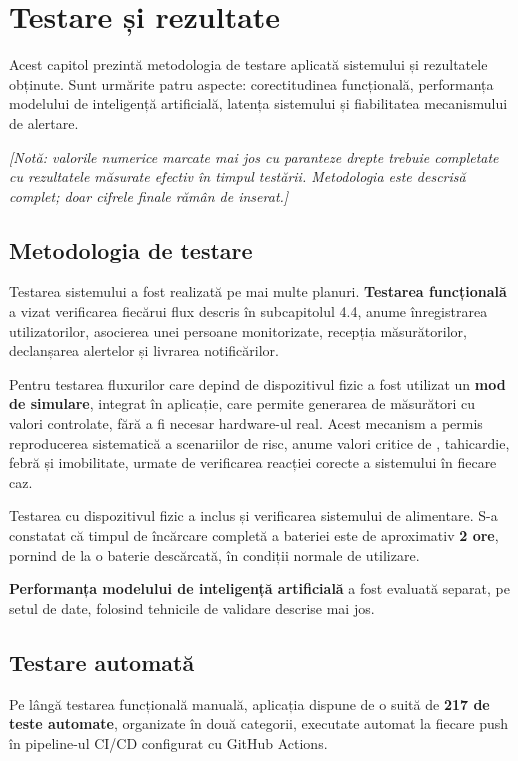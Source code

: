 \newpage
\section{Testare și rezultate}

Acest capitol prezintă metodologia de testare aplicată sistemului și rezultatele obținute. Sunt urmărite patru aspecte: corectitudinea funcțională, performanța modelului de inteligență artificială, latența sistemului și fiabilitatea mecanismului de alertare.

\textit{[Notă: valorile numerice marcate mai jos cu paranteze drepte trebuie completate cu rezultatele măsurate efectiv în timpul testării. Metodologia este descrisă complet; doar cifrele finale rămân de inserat.]}

\subsection{Metodologia de testare}

Testarea sistemului a fost realizată pe mai multe planuri. \textbf{Testarea funcțională} a vizat verificarea fiecărui flux descris în subcapitolul 4.4, anume înregistrarea utilizatorilor, asocierea unei persoane monitorizate, recepția măsurătorilor, declanșarea alertelor și livrarea notificărilor.

Pentru testarea fluxurilor care depind de dispozitivul fizic a fost utilizat un \textbf{mod de simulare}, integrat în aplicație, care permite generarea de măsurători cu valori controlate, fără a fi necesar hardware-ul real. Acest mecanism a permis reproducerea sistematică a scenariilor de risc, anume valori critice de \spo, tahicardie, febră și imobilitate, urmate de verificarea reacției corecte a sistemului în fiecare caz.

Testarea cu dispozitivul fizic a inclus și verificarea sistemului de alimentare. S-a constatat că timpul de încărcare completă a bateriei este de aproximativ \textbf{2 ore}, pornind de la o baterie descărcată, în condiții normale de utilizare.

\textbf{Performanța modelului de inteligență artificială} a fost evaluată separat, pe setul de date, folosind tehnicile de validare descrise mai jos.

\subsection{Testare automată}

Pe lângă testarea funcțională manuală, aplicația dispune de o suită de \textbf{217 de teste automate}, organizate în două categorii, executate automat la fiecare push în pipeline-ul CI/CD configurat cu GitHub Actions.

